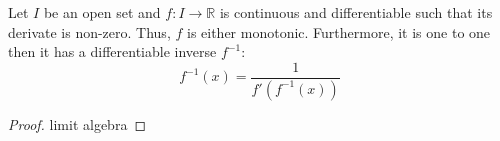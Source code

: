 \begin{theorem}
    Let \(I\) be an open set and \(f : I \to \mathbb{R}\) is continuous and differentiable such that its derivate is non-zero. Thus, \(f\) is either monotonic. Furthermore, it is one to one then it has a differentiable inverse \(f^{-1}\):
    \[f^{-1}(x) = \dfrac{1}{f'(f^{-1}(x))}\]
\end{theorem}
\begin{proof}
    limit algebra
\end{proof}
